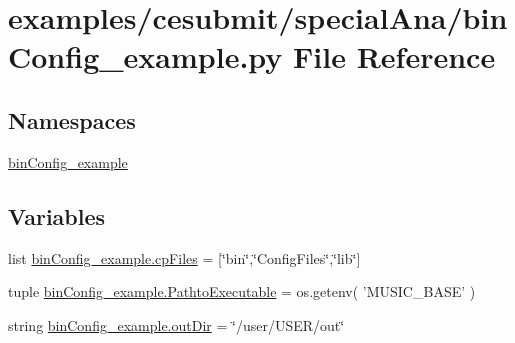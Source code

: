 \section{examples/cesubmit/special\-Ana/bin\-Config\-\_\-example.py File Reference}
\label{binConfig__example_8py}
\subsection*{Namespaces}
\begin{DoxyCompactItemize}
\item 
\hyperlink{namespacebinConfig__example}{bin\-Config\-\_\-example}
\end{DoxyCompactItemize}
\subsection*{Variables}
\begin{DoxyCompactItemize}
\item 
list \hyperlink{namespacebinConfig__example_a1ab84e59216b8e8b7a873db8f52cbbe5}{bin\-Config\-\_\-example.\-cp\-Files} = \mbox{[}\char`\"{}bin\char`\"{},\char`\"{}Config\-Files\char`\"{},\char`\"{}lib\char`\"{}\mbox{]}
\item 
tuple \hyperlink{namespacebinConfig__example_afa74a05175efd45e5fb0043b57f5706d}{bin\-Config\-\_\-example.\-Pathto\-Executable} = os.\-getenv( 'M\-U\-S\-I\-C\-\_\-\-B\-A\-S\-E' )
\item 
string \hyperlink{namespacebinConfig__example_a8a7d12ed52cd5c85fb64de14d725e1eb}{bin\-Config\-\_\-example.\-out\-Dir} = \char`\"{}/user/U\-S\-E\-R/out\char`\"{}
\end{DoxyCompactItemize}

